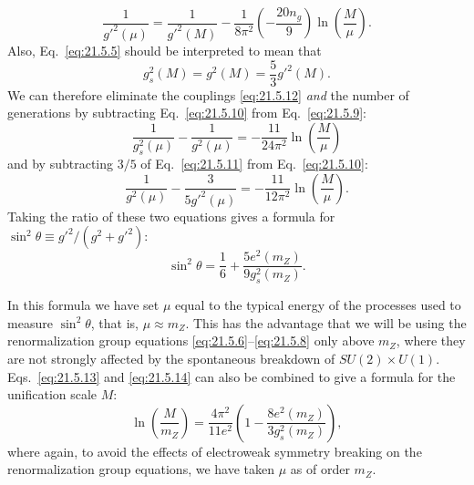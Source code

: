\begin{equation}
\frac{1}{g'^2(\mu)}
=\frac{1}{g'^2(M)}
-\frac{1}{8\pi^2}
\left(-\frac{20n_g}{9}\right)
\ln\left(\frac{M}{\mu}\right).
\tag{21.5.11}\label{eq:21.5.11}
\end{equation}
Also, Eq.~\eqref{eq:21.5.5} should be interpreted to mean that
\begin{equation}
g_s^2(M)=g^2(M)=\frac{5}{3}g'^2(M).
\tag{21.5.12}\label{eq:21.5.12}
\end{equation}
We can therefore eliminate the couplings \eqref{eq:21.5.12} \emph{and} the number of generations by subtracting Eq.~\eqref{eq:21.5.10} from Eq.~\eqref{eq:21.5.9}:
\begin{equation}
\frac{1}{g_s^2(\mu)}-\frac{1}{g^2(\mu)}
=-\frac{11}{24\pi^2}\ln\left(\frac{M}{\mu}\right)
\tag{21.5.13}\label{eq:21.5.13}
\end{equation}
and by subtracting $3/5$ of Eq.~\eqref{eq:21.5.11} from Eq.~\eqref{eq:21.5.10}:
\begin{equation}
\frac{1}{g^2(\mu)}-\frac{3}{5g'^2(\mu)}
=-\frac{11}{12\pi^2}\ln\left(\frac{M}{\mu}\right).
\tag{21.5.14}\label{eq:21.5.14}
\end{equation}
Taking the ratio of these two equations gives a formula for $\sin^2\theta\equiv g'^2/(g^2+g'^2)$:
\begin{equation}
\sin^2\theta
=\frac{1}{6}
+\frac{5e^2(m_Z)}{9g_s^2(m_Z)}.
\tag{21.5.15}\label{eq:21.5.15}
\end{equation}

In this formula we have set $\mu$ equal to the typical energy of the processes used to measure $\sin^2\theta$, that is, $\mu\approx m_Z$. This has the advantage that we will be using the renormalization group equations \eqref{eq:21.5.6}--\eqref{eq:21.5.8} only above $m_Z$, where they are not strongly affected by the spontaneous breakdown of $SU(2)\times U(1)$. Eqs.~\eqref{eq:21.5.13} and \eqref{eq:21.5.14} can also be combined to give a formula for the unification scale $M$:
\begin{equation}
\ln\left(\frac{M}{m_Z}\right)
=\frac{4\pi^2}{11e^2}
\left(1-\frac{8e^2(m_Z)}{3g_s^2(m_Z)}\right),
\tag{21.5.16}\label{eq:21.5.16}
\end{equation}
where again, to avoid the effects of electroweak symmetry breaking on the renormalization group equations, we have taken $\mu$ as of order $m_Z$.

